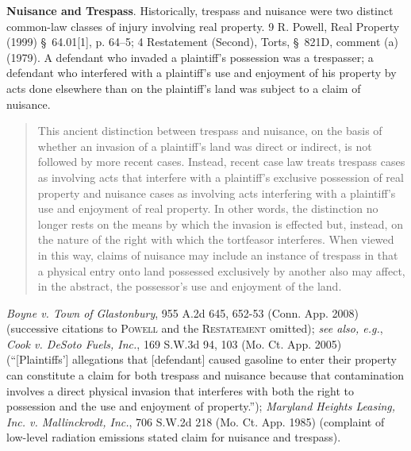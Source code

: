 \item \textbf{Nuisance and Trespass}.
Historically, trespass and nuisance were two distinct common-law classes of
injury involving real property. 9 R. Powell, Real Property (1999) \S~64.01[1],
p. 64--5; 4 Restatement (Second), Torts, \S~821D, comment (a) (1979). A
defendant who invaded a plaintiff's possession was a trespasser; a defendant who
interfered with a plaintiff's use and enjoyment of his property by acts done
elsewhere than on the plaintiff's land was subject to a claim of nuisance. 
\begin{quote}
This ancient distinction between trespass and nuisance, on the basis of whether
an invasion of a plaintiff's land was direct or indirect, is not followed by
more recent cases. Instead, recent case law treats trespass cases as involving
acts that interfere with a plaintiff's exclusive possession of real property and
nuisance cases as involving acts interfering with a plaintiff's use and
enjoyment of real property. In other words, the distinction no longer rests on
the means by which the invasion is effected but, instead, on the nature of the
right with which the tortfeasor interferes. When viewed in this way, claims of
nuisance may include an instance of trespass in that a physical entry onto land
possessed exclusively by another also may affect, in the abstract, the
possessor's use and enjoyment of the land.
\end{quote}
\emph{Boyne v. Town of Glastonbury}, 955 A.2d 645, 652-53 (Conn. App. 2008)
(successive citations to \textsc{Powell} and the \textsc{Restatement} omitted);
\textit{see also, e.g.}, \emph{Cook v. DeSoto Fuels, Inc.}, 169 S.W.3d 94, 103
(Mo. Ct. App. 2005) (``[Plaintiffs'] allegations that [defendant] caused
gasoline to enter their property can constitute a claim for both trespass and
nuisance because that contamination involves a direct physical invasion that
interferes with both the right to possession and the use and enjoyment of
property.''); \emph{Maryland Heights Leasing, Inc. v. Mallinckrodt, Inc.}, 706
S.W.2d 218 (Mo. Ct. App. 1985) (complaint of low-level radiation emissions
stated claim for nuisance and trespass).


